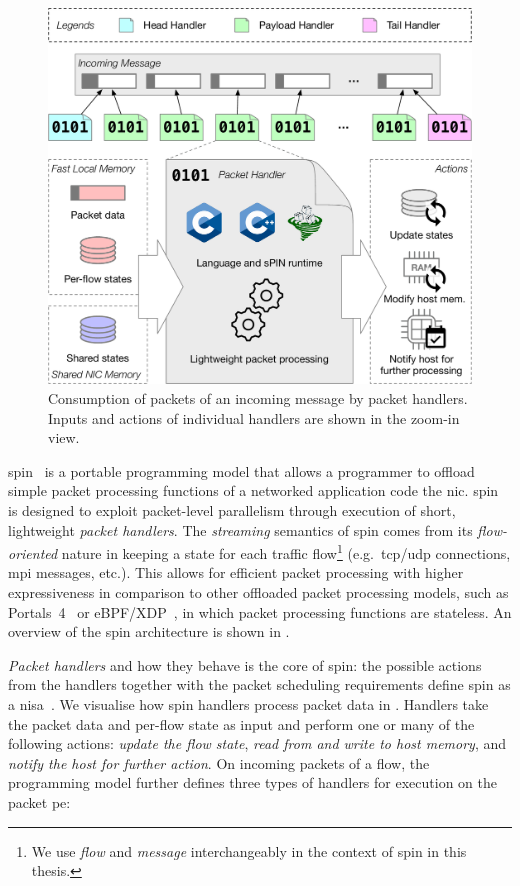 \begin{figure}[tp]
    \centering
    \includegraphics[width=.85\textwidth]{thesis/figures/spin-handlers.pdf}
    \caption{Consumption of packets of an incoming message by packet handlers.  Inputs and actions of individual handlers are shown in the zoom-in view.} \label{fig:spin-handlers}
\end{figure}

\ac{spin}~\cite{hoefler_spin_2017} is a portable programming model that allows a programmer to offload simple packet processing functions of a networked application code the \ac{nic}.  \ac{spin} is designed to exploit packet-level parallelism through execution of short, lightweight \textit{packet handlers}.  The \emph{streaming} semantics of \ac{spin} comes from its \emph{flow-oriented} nature in keeping a state for each traffic flow\footnote{We use \emph{flow} and \emph{message} interchangeably in the context of \ac{spin} in this thesis.} (e.g.\ \acs{tcp}/\acs{udp} connections, \acs{mpi} messages, etc.).  This allows for efficient packet processing with higher expressiveness in comparison to other offloaded packet processing models, such as Portals~4~\cite{bosshart_p4_2014} or eBPF/XDP~\cite{vieira_fast_2021}, in which packet processing functions are stateless.  An overview of the \ac{spin} architecture is shown in .

\emph{Packet handlers} and how they behave is the core of \ac{spin}: the possible actions from the handlers together with the packet scheduling requirements define \ac{spin} as a \ac{nisa}~\cite{hoefler_spin_2017}.  We visualise how \ac{spin} handlers process packet data in .  Handlers take the packet data and per-flow state as input and perform one or many of the following actions: \emph{update the flow state}, \emph{read from and write to host memory}, and \emph{notify the host for further action}.  On incoming packets of a flow, the programming model further defines three types of handlers for execution on the packet \ac{pe}:

